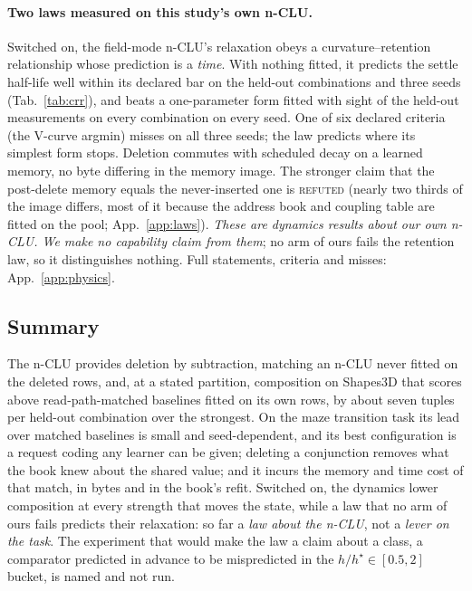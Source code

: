 \documentclass{article} %
\begin{document}
\paragraph{Two laws measured on this study's own n-CLU.}
Switched on, the field-mode n-CLU's relaxation obeys a curvature--retention relationship whose
prediction is a \emph{time}. With nothing fitted, it predicts the settle half-life
well within its declared bar on the held-out combinations and three seeds (Tab.~\ref{tab:crr}), and beats a one-parameter form fitted with sight of the held-out
measurements on every combination on every seed. One of six declared criteria (the V-curve
argmin) misses on all three seeds; the law predicts where its simplest form stops.
Deletion commutes with scheduled decay on a learned memory, no byte differing in the
memory image. The stronger claim that the post-delete memory equals the never-inserted one is \textsc{refuted} (nearly two thirds of the image differs, most of it because the
address book and coupling table are fitted on the pool; App.~\ref{app:laws}). %
\emph{These are dynamics results about our own n-CLU. We make no capability claim from them}; no arm of ours fails the retention law, so it distinguishes nothing. Full statements, criteria and misses: App.~\ref{app:physics}.

\subsection{Summary}
\label{sec:leaving}

The n-CLU provides deletion by subtraction, matching an n-CLU never fitted on the deleted rows, and, at a stated partition, composition on
Shapes3D that scores above read-path-matched baselines fitted on its own rows, by about seven tuples per
held-out combination over the strongest. On the maze transition task its lead over matched
baselines is small and seed-dependent, and its best configuration is a request coding any learner can be
given; deleting a conjunction removes what the book knew about the shared value; and it incurs the
memory and time cost of that match, in bytes and in the book's refit. Switched on, the dynamics lower composition at
every strength that moves the state, while a law that no arm of ours fails predicts their relaxation:
so far a \emph{law about the n-CLU}, not a \emph{lever on the task}. The experiment that would make
the law a claim about a class, a comparator predicted in advance to be mispredicted in the
$h/h^\star\in[0.5,2]$ bucket, is named and not run. %
\end{document}
